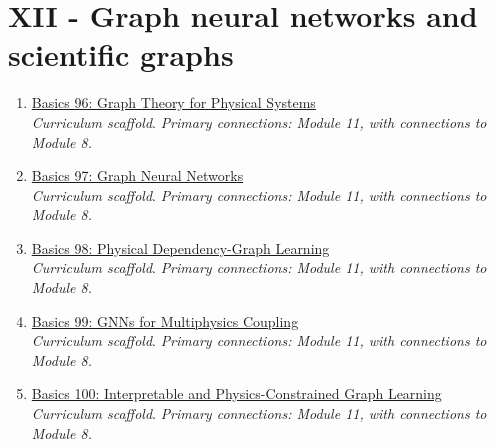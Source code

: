 \documentclass[11pt]{article}
\begin{document}
\section{XII - Graph neural networks and scientific graphs}
\begin{enumerate}[leftmargin=2.4em]
\item[\textbf{96.}] \href{run:basics_96_graph_theory_for_physical_systems.pdf}{Basics 96: Graph Theory for Physical Systems}\\[-0.2em]
\textit{Curriculum scaffold}. \textit{Primary connections: Module 11, with connections to Module 8.}
\item[\textbf{97.}] \href{run:basics_97_graph_neural_networks.pdf}{Basics 97: Graph Neural Networks}\\[-0.2em]
\textit{Curriculum scaffold}. \textit{Primary connections: Module 11, with connections to Module 8.}
\item[\textbf{98.}] \href{run:basics_98_physical_dependency_graph_learning.pdf}{Basics 98: Physical Dependency-Graph Learning}\\[-0.2em]
\textit{Curriculum scaffold}. \textit{Primary connections: Module 11, with connections to Module 8.}
\item[\textbf{99.}] \href{run:basics_99_gnns_for_multiphysics_coupling.pdf}{Basics 99: GNNs for Multiphysics Coupling}\\[-0.2em]
\textit{Curriculum scaffold}. \textit{Primary connections: Module 11, with connections to Module 8.}
\item[\textbf{100.}] \href{run:basics_100_interpretable_and_physics_constrained_graph_learning.pdf}{Basics 100: Interpretable and Physics-Constrained Graph Learning}\\[-0.2em]
\textit{Curriculum scaffold}. \textit{Primary connections: Module 11, with connections to Module 8.}
\end{enumerate}
\end{document}
